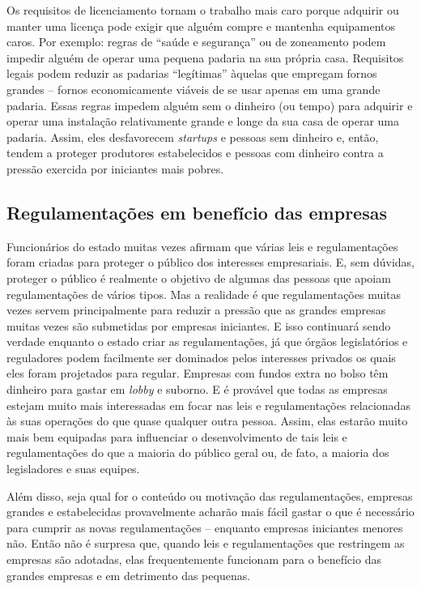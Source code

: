 Os requisitos de licenciamento tornam o trabalho mais caro porque adquirir ou manter uma licença pode exigir que alguém compre e mantenha equipamentos caros. Por exemplo: regras de ``saúde e segurança'' ou de zoneamento podem impedir alguém de operar uma pequena padaria na sua própria casa. Requisitos legais podem reduzir as padarias ``legítimas'' àquelas que empregam fornos grandes -- fornos economicamente viáveis de se usar apenas em uma grande padaria. Essas regras impedem alguém sem o dinheiro (ou tempo) para adquirir e operar uma instalação relativamente grande e longe da sua casa de operar uma padaria. Assim, eles desfavorecem \emph{startups} e pessoas sem dinheiro e, então, tendem a proteger produtores estabelecidos e pessoas com dinheiro contra a pressão exercida por iniciantes mais pobres.

\subsection*{Regulamentações em benefício das empresas}

Funcionários do estado muitas vezes afirmam que várias leis e regulamentações foram criadas para proteger o público dos interesses empresariais. E, sem dúvidas, proteger o público é realmente o objetivo de algumas das pessoas que apoiam regulamentações de vários tipos. Mas a realidade é que regulamentações muitas vezes servem principalmente para reduzir a pressão que as grandes empresas muitas vezes são submetidas por empresas iniciantes. E isso continuará sendo verdade enquanto o estado criar as regulamentações, já que órgãos legislatórios e reguladores podem facilmente ser dominados pelos interesses privados os quais eles foram projetados para regular. Empresas com fundos extra no bolso têm dinheiro para gastar em \emph{lobby} e suborno. E é provável que todas as empresas estejam muito mais interessadas em focar nas leis e regulamentações relacionadas às suas operações do que quase qualquer outra pessoa. Assim, elas estarão muito mais bem equipadas para influenciar o desenvolvimento de tais leis e regulamentações do que a maioria do público geral ou, de fato, a maioria dos legisladores e suas equipes.

Além disso, seja qual for o conteúdo ou motivação das regulamentações, empresas grandes e estabelecidas provavelmente acharão mais fácil gastar o que é necessário para cumprir as novas regulamentações -- enquanto empresas iniciantes menores não. Então não é surpresa que, quando leis e regulamentações que restringem as empresas são adotadas, elas frequentemente funcionam para o benefício das grandes empresas e em detrimento das pequenas.

